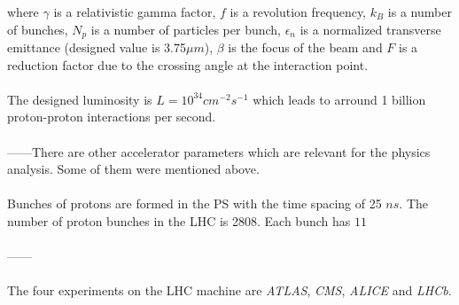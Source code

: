 where $\gamma$ is a relativistic gamma factor, $f$ is a revolution frequency, $k_{B}$ is a number of bunches,
$N_{p}$ is a number of particles per bunch, $\epsilon_{n}$ is a normalized transverse emittance (designed value
is 3.75$\mu m$), $\beta$ is the focus of the beam and $F$ is a reduction factor due to the crossing angle at the 
interaction point.
\\
\\
The designed luminosity is $L = 10^{34} cm^{-2}s^{-1}$ which leads to arround 1 billion proton-proton 
interactions per second.
\\
\\
------There are other accelerator parameters which are relevant for the physics analysis. Some of them were
mentioned above.
\\
\\
Bunches of protons are formed in the PS with the time spacing of 25 $ns$. The number of proton bunches in the LHC is
2808. Each bunch has $11 $
\\
\\
------
\\
\\
The four experiments on the LHC machine are \textit{ATLAS}, \textit{CMS}, \textit{ALICE} and \textit{LHCb}.
% 
